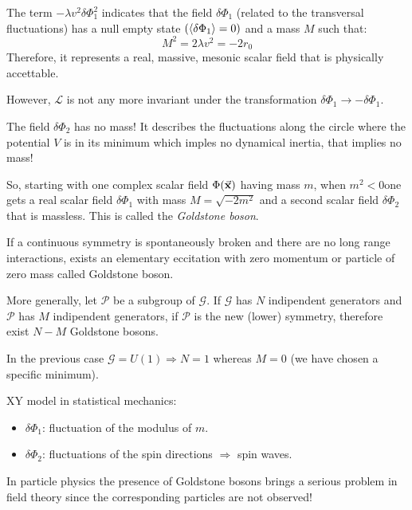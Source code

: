 \documentclass[../main/main.tex]{subfiles}
\begin{document}
\begin{remark}
The term \( - \lambda v^2 \delta \Phi _1^2 \) indicates that the field \( \delta \Phi _1 \) (related to the transversal fluctuations) has a null empty state \( ( \expval{\delta \Phi _1}= 0 ) \) and a mass \( M \) such that:
\begin{equation}
  M^2 = 2 \lambda v^2 = - 2 r_0
\end{equation}
Therefore, it represents a real, massive, mesonic scalar field that is physically accettable.

However, \( \mathcal{L} \) is not any more invariant under the transformation \( \delta \Phi _1 \rightarrow - \delta \Phi _1 \).
\end{remark}
\begin{remark}
The field \( \delta \Phi _2 \) has no mass! It describes the fluctuations along the circle where the potential \( V \) is in its minimum  which imples no dynamical inertia, that implies no mass!
\end{remark}
So, starting with one complex scalar field \( \Phi (\va{x}) \) having mass \( m \), when \( m^2 < 0 \)one gets a real scalar field \( \delta \Phi _1 \) with mass \( M = \sqrt{- 2 m^2}  \)  and a second scalar field \( \delta \Phi _2 \) that is massless. This is called the \emph{Goldstone boson}.
\begin{theorem}[]
If a continuous symmetry is spontaneously broken and there are no long range interactions, exists an elementary eccitation with zero momentum or particle of zero mass called Goldstone boson.
\end{theorem}
More generally, let \( \mathcal{P} \) be a subgroup of \( \mathcal{G} \). If \( \mathcal{G} \) has \( N \) indipendent generators and \( \mathcal{P} \)  has \( M \) indipendent generators, if \( \mathcal{P} \) is the new (lower) symmetry, therefore exist \( N-M \)  Goldstone bosons.

In the previous case \( \mathcal{G} = U (1)  \Rightarrow  N=1\) whereas \( M=0 \) (we have chosen a specific minimum).
\begin{example}
XY model in statistical mechanics:
\begin{itemize}
\item \( \delta \Phi _1 \): fluctuation of the modulus of \( m \).
\item \( \delta \Phi _2 \): fluctuations of the spin directions \( \Rightarrow  \) spin waves.
\end{itemize}
\end{example}
\begin{remark}
In particle physics the presence of Goldstone bosons brings a serious problem in field theory since the corresponding particles are not observed!
\end{remark}
\end{document}
